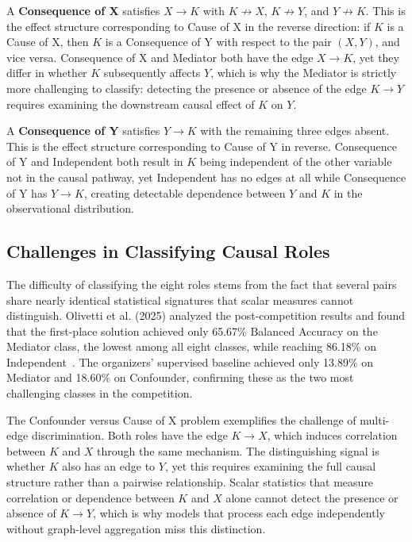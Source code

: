 A \textbf{Consequence of X} satisfies $X\to K$ with $K\not\to X$, $K\not\to Y$, and $Y\not\to K$. This is the effect structure corresponding to Cause of X in the reverse direction: if $K$ is a Cause of X, then $K$ is a Consequence of Y with respect to the pair $(X,Y)$, and vice versa. Consequence of X and Mediator both have the edge $X\to K$, yet they differ in whether $K$ subsequently affects $Y$, which is why the Mediator is strictly more challenging to classify: detecting the presence or absence of the edge $K\to Y$ requires examining the downstream causal effect of $K$ on $Y$.

A \textbf{Consequence of Y} satisfies $Y\to K$ with the remaining three edges absent. This is the effect structure corresponding to Cause of Y in reverse. Consequence of Y and Independent both result in $K$ being independent of the other variable not in the causal pathway, yet Independent has no edges at all while Consequence of Y has $Y\to K$, creating detectable dependence between $Y$ and $K$ in the observational distribution.

\subsection{Challenges in Classifying Causal Roles}
\label{sec:role_challenges}

The difficulty of classifying the eight roles stems from the fact that several pairs share nearly identical statistical signatures that scalar measures cannot distinguish. Olivetti et al. (2025) analyzed the post-competition results and found that the first-place solution achieved only 65.67\% Balanced Accuracy on the Mediator class, the lowest among all eight classes, while reaching 86.18\% on Independent~\cite{olivetti2025adialab}. The organizers' supervised baseline achieved only 13.89\% on Mediator and 18.60\% on Confounder, confirming these as the two most challenging classes in the competition.

The Confounder versus Cause of X problem exemplifies the challenge of multi-edge discrimination. Both roles have the edge $K\to X$, which induces correlation between $K$ and $X$ through the same mechanism. The distinguishing signal is whether $K$ also has an edge to $Y$, yet this requires examining the full causal structure rather than a pairwise relationship. Scalar statistics that measure correlation or dependence between $K$ and $X$ alone cannot detect the presence or absence of $K\to Y$, which is why models that process each edge independently without graph-level aggregation miss this distinction.

